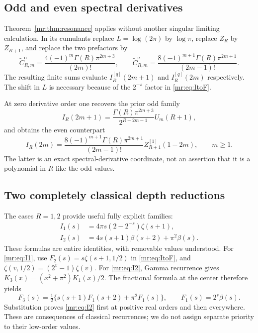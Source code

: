 \documentclass[11pt,letterpaper]{article}
\theoremstyle{definition}\newtheorem{definition}[theorem]{Definition}
\theoremstyle{remark}\newtheorem{remark}[theorem]{Remark}
\begin{document}
\subsection{Odd and even spectral derivatives}
Theorem~\ref{mr:thm:resonance} applies without another singular limiting
calculation. In its cumulants replace $L=\log(2\pi)$ by $\log\pi$,
replace $Z_R$ by $Z_{R+1}$, and replace the two prefactors by
\begin{equation}\label{mr:eq:Ipre}
 \widetilde C_{R,m}^{\mathrm o}
 =\frac{4(-1)^m\Gamma(R)\pi^{2m+3}}{(2m)!},\qquad
 \widetilde C_{R,m}^{\mathrm e}
 =\frac{8(-1)^{m+1}\Gamma(R)\pi^{2m+1}}{(2m-1)!}.
\end{equation}
The resulting finite sums evaluate $I_R^{[q]}(2m+1)$ and
$I_R^{[q]}(2m)$ respectively. The shift in $L$ is necessary because
of the $2^{-s}$ factor in \eqref{mr:eq:ItoF}.

At zero derivative order one recovers the prior odd family
\begin{equation}\label{mr:eq:Iodd}
 I_R(2m+1)=\frac{\Gamma(R)\pi^{2m+3}}{2^{R+2m-1}}U_m(R+1),
\end{equation}
and obtains the even counterpart
\begin{equation}\label{mr:eq:Ieven}
 I_R(2m)=\frac{8(-1)^{m+1}\Gamma(R)\pi^{2m+1}}{(2m-1)!}
                  Z_{R+1}^{[1]}(1-2m),\qquad m\ge1.
\end{equation}
The latter is an exact spectral-derivative coordinate, not an assertion
that it is a polynomial in $R$ like the odd values.

\subsection{Two completely classical depth reductions}
The cases $R=1,2$ provide useful fully explicit families:
\begin{align}
 I_1(s)&=4\pi s(2-2^{-s})\zeta(s+1),\label{mr:eq:I1}\\
 I_2(s)&=4s(s+1)\beta(s+2)+\pi^2\beta(s).
 \label{mr:eq:I2}
\end{align}
These formulas are entire identities, with removable values understood.
For \eqref{mr:eq:I1}, use $F_2(s)=s\zeta(s+1,1/2)$ in
\eqref{mr:eq:ItoF}, and
$\zeta(v,1/2)=(2^v-1)\zeta(v)$.
For \eqref{mr:eq:I2}, Gamma recurrence gives
$K_3(x)=(x^2+\pi^2)K_1(x)/2$. The fractional formula at the center
therefore yields
\[
 F_3(s)=\tfrac12\{s(s+1)F_1(s+2)+\pi^2F_1(s)\},
 \qquad F_1(s)=2^s\beta(s).
\]
Substitution proves \eqref{mr:eq:I2} first at positive real orders
and then everywhere. These are consequences of classical recurrences;
we do not assign separate priority to their low-order values.
\end{document}
